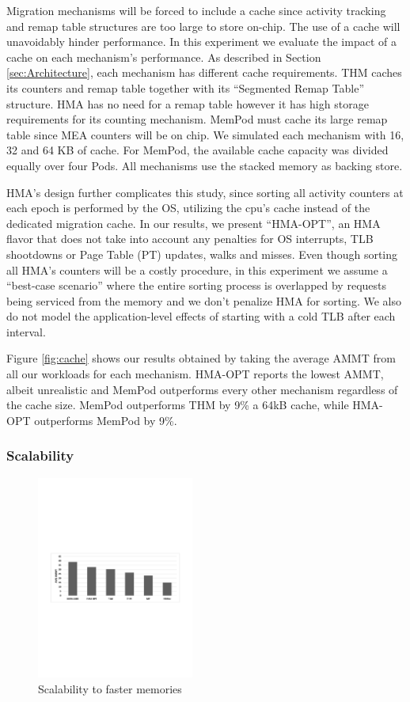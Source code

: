 Migration mechanisms will be forced to include a cache since activity tracking and remap table structures are too large to store on-chip. The use of a cache will unavoidably hinder performance. In this experiment we evaluate the impact of a cache on each mechanism's performance. As described in Section \ref{sec:Architecture}, each mechanism has different cache requirements. THM caches its counters and remap table together with its ``Segmented Remap Table'' structure. HMA has no need for a remap table however it has high storage requirements for its counting mechanism. MemPod must cache its large remap table since MEA counters will be on chip. We simulated each mechanism with 16, 32 and 64 KB of cache. For MemPod, the available cache capacity was divided equally over four Pods. All mechanisms use the stacked memory as backing store.

HMA's design further complicates this study, since sorting all activity counters at each epoch is performed by the OS, utilizing the cpu's cache instead of the dedicated migration cache. In our results, we present ``HMA-OPT'', an HMA flavor that does not take into account any penalties for OS interrupts, TLB shootdowns or Page Table (PT) updates, walks and misses. Even though sorting all HMA's counters will be a costly procedure, in this experiment we assume a ``best-case scenario'' where the entire sorting process is overlapped by requests being serviced from the memory and we don't penalize HMA for sorting. We also do not model the application-level effects of starting with a cold TLB after each interval.

Figure \ref{fig:cache} shows our results obtained by taking the average AMMT from all our workloads for each mechanism. HMA-OPT reports the lowest AMMT, albeit unrealistic and MemPod outperforms every other mechanism regardless of the cache size. MemPod outperforms THM by 9\% a 64kB cache, while HMA-OPT outperforms MemPod by 9\%.

\subsubsection{Scalability}

\begin{figure}
  \includegraphics[width=0.46\textwidth]{figures/scalability.pdf}
  \caption{Scalability to faster memories}
  \label{fig:scalability}
\end{figure}

